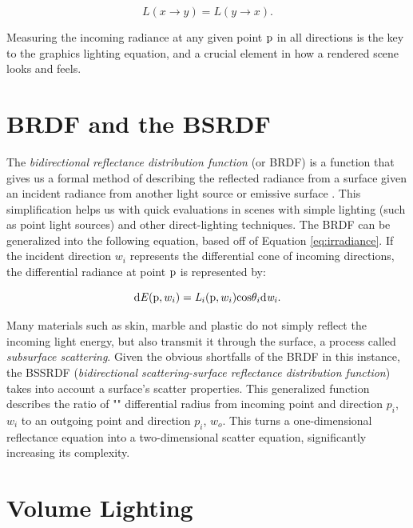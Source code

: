 \documentclass[12pt]{ucthesis}
\begin{document}
\begin{equation}
L(x \to y) = L(y \to x).
\label{eq:invariance}
\end{equation}

Measuring the incoming radiance at any given point $\textup{p}$ in all directions is the key to the graphics lighting equation, and a crucial element in how a rendered scene looks and feels.

\section{BRDF and the BSRDF}

The \textit{bidirectional reflectance distribution function} (or BRDF) is a function that gives us a formal method of describing the reflected radiance from a surface given an incident radiance from another light source or emissive surface \cite{brdf}.  This simplification helps us with quick evaluations in scenes with simple lighting (such as point light sources) and other direct-lighting techniques.  The BRDF can be generalized into the following equation, based off of Equation \ref{eq:irradiance}.  If the incident direction $w_{i}$ represents the differential cone of incoming directions, the differential radiance at point $\textup{p}$ is represented by:

\begin{equation}
\textup{d}\mathit{E}(\textup{p}, w_{i}) = \mathit{L}_{i}(\textup{p}, w_{i})\textup{cos}\theta_{i} \textup{d}\mathit{w_{i}}.
\label{eq:brdf}
\end{equation}


Many materials such as skin, marble and plastic do not simply reflect the incoming light energy, but also transmit it through the surface, a process called \textit{subsurface scattering}.  Given the obvious shortfalls of the BRDF in this instance, the BSSRDF (\textit{bidirectional scattering-surface reflectance distribution function}) takes into account a surface's scatter properties.  This generalized function describes the ratio of "" differential radius from incoming point and direction $\textit{p}_{i}$, $w_{i}$ to an outgoing point and direction $\textit{p}_{i}$, $w_{o}$.  This turns a one-dimensional reflectance equation into a two-dimensional scatter equation, significantly increasing its complexity.

\section{Volume Lighting}
\end{document}
